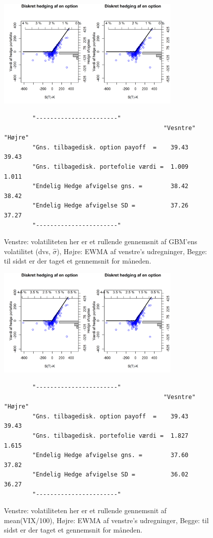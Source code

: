 \documentclass{article}
\theoremstyle{definition}
\theoremstyle{remark}
\begin{document}
\begin{figure}
    \centering
    \includegraphics[width=3.5in]{1 product_call_meanrolling_meanEMVA}
    \caption{Venstre: volatiliteten her er et rullende \color{red}gennemsnit\color{black} af GBM'ens volatilitet (dvs, $\hat\sigma$), Højre: EWMA af venstre's udregninger, Begge: til sidst er der taget et gennemsnit for måneden\color{red}.\color{black}}
    \begin{verbatim}
        "-----------------------"                         
                                             "Vesntre"       "Højre"
        "Gns. tilbagedisk. option payoff  =    39.43          39.43
        "Gns. tilbagedisk. portefolie værdi =  1.009          1.011
        "Endelig Hedge afvigelse gns. =        38.42          38.42
        "Endelig Hedge afvigelse SD =          37.26          37.27
        "-----------------------"
    \end{verbatim}
    \label{fig:rullende}
\end{figure}
\begin{figure}
    \centering
    \includegraphics[width=3.5in]{2 product_call_meanrolling_meanEMVA}
    \caption{Venstre: volatiliteten her er et rullende \color{red}gennemsnit\color{black} af mean(VIX/100), Højre: EWMA af venstre's udregninger, Begge: til sidst er der taget et gennemsnit for måneden\color{red}.\color{black}}
    \begin{verbatim}
        "-----------------------"                         
                                             "Vesntre"       "Højre"
        "Gns. tilbagedisk. option payoff  =    39.43          39.43
        "Gns. tilbagedisk. portefolie værdi =  1.827          1.615
        "Endelig Hedge afvigelse gns. =        37.60          37.82
        "Endelig Hedge afvigelse SD =          36.02          36.27
        "-----------------------"
    \end{verbatim}
    \label{fig:rullendeVIX}
\end{figure}
\end{document}
